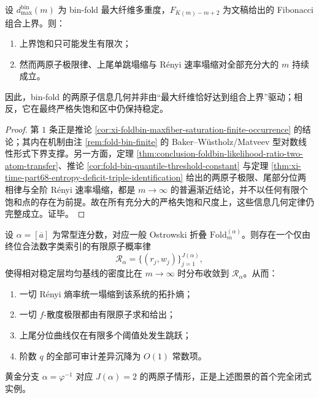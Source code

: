 \begin{theorem}[严格失饱和区中的两原子持久性]\label{thm:conclusion-binfold-twoatom-persistence-in-strict-nonsaturation-region}
设 \(d_{\max}^{\mathrm{bin}}(m)\) 为 bin-fold 最大纤维多重度，\(F_{K(m)-m+2}\) 为文稿给出的 Fibonacci 组合上界。则：
\begin{enumerate}
  \item 上界饱和只可能发生有限次；
  \item 然而两原子极限律、上尾单跳塌缩与 Rényi 速率塌缩对全部充分大的 \(m\) 持续成立。
\end{enumerate}
因此，bin-fold 的两原子信息几何并非由“最大纤维恰好达到组合上界”驱动；相反，它在最终严格失饱和区中仍保持稳定。
\end{theorem}

\begin{proof}
第 \(1\) 条正是推论 \ref{cor:xi-foldbin-maxfiber-saturation-finite-occurrence} 的结论；其内在机制由注 \ref{rem:fold-bin-finite} 的 Baker--W\"ustholz/Matveev 型对数线性形式下界支撑。另一方面，定理 \ref{thm:conclusion-foldbin-likelihood-ratio-two-atom-transfer}、推论 \ref{cor:fold-bin-quantile-threshold-constant} 与定理 \ref{thm:xi-time-part68-entropy-deficit-triple-identification} 给出的两原子极限、尾部分位两相律与全阶 Rényi 速率塌缩，都是 \(m\to\infty\) 的普遍渐近结论，并不以任何有限个饱和点的存在为前提。故在所有充分大的严格失饱和尺度上，这些信息几何定律仍完整成立。证毕。
\end{proof}

\begin{conjecture}\label{conj:conclusion-constant-type-ostrowski-terminal-atom-universality}
设 \(\alpha=[\overline a]\) 为常型连分数，对应一般 Ostrowski 折叠 \(\mathrm{Fold}_m^{(\alpha)}\)。则存在一个仅由终位合法数字类索引的有限原子概率律
\[
\mathscr R_\alpha=\{(r_j,w_j)\}_{j=1}^{J(\alpha)},
\]
使得相对稳定层均匀基线的密度比在 \(m\to\infty\) 时分布收敛到 \(\mathscr R_\alpha\)。从而：
\begin{enumerate}
  \item 一切 Rényi 熵率统一塌缩到该系统的拓扑熵；
  \item 一切 \(f\)-散度极限都由有限原子求和给出；
  \item 上尾分位曲线仅在有限多个阈值处发生跳跃；
  \item 阶数 \(q\) 的全部可审计差异沉降为 \(O(1)\) 常数项。
\end{enumerate}
黄金分支 \(\alpha=\varphi^{-1}\) 对应 \(J(\alpha)=2\) 的两原子情形，正是上述图景的首个完全闭式实例。
\end{conjecture}
